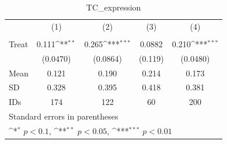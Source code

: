 \begin{table}[htbp]\centering
\def\sym#1{\ifmmode^{#1}\else\(^{#1}\)\fi}
\caption{TC\_expression}
\begin{tabular}{l*{4}{c}}
\hline\hline
                                &\multicolumn{1}{c}{(1)}&\multicolumn{1}{c}{(2)}&\multicolumn{1}{c}{(3)}&\multicolumn{1}{c}{(4)}\\
                                &\multicolumn{1}{c}{}&\multicolumn{1}{c}{}&\multicolumn{1}{c}{}&\multicolumn{1}{c}{}\\
\hline
Treat                           &    0.111\sym{**} &    0.265\sym{***}&   0.0882         &    0.210\sym{***}\\
                                & (0.0470)         & (0.0864)         &  (0.119)         & (0.0480)         \\
\hline
Mean                            &    0.121         &    0.190         &    0.214         &    0.173         \\
SD                              &    0.328         &    0.395         &    0.418         &    0.381         \\
IDs                             &      174         &      122         &       60         &      200         \\
\hline\hline
\multicolumn{5}{l}{\footnotesize Standard errors in parentheses}\\
\multicolumn{5}{l}{\footnotesize \sym{*} \(p<0.1\), \sym{**} \(p<0.05\), \sym{***} \(p<0.01\)}\\
\end{tabular}
\end{table}
